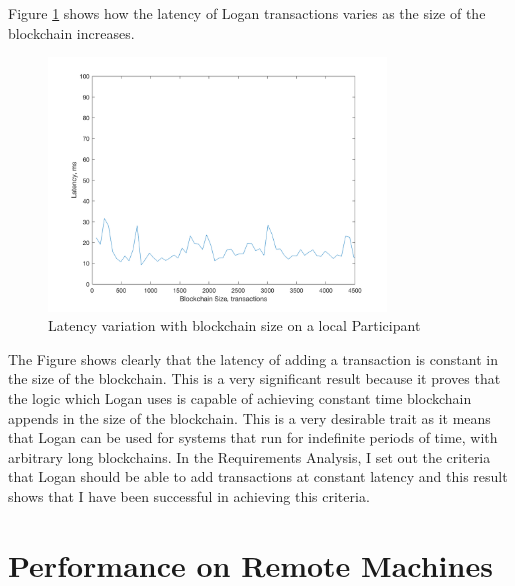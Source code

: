 \documentclass[12pt,a4paper,twoside,openright]{report}
\begin{document}
	Figure \ref{fig:locallatency} shows how the latency of Logan transactions varies as the size of the blockchain increases. 
	\begin{figure}
		\centering
		\includegraphics[width=0.8\textwidth]{figs/local_latency_vs_size.png}
		\caption{Latency variation with blockchain size on a local Participant}
		\label{fig:locallatency}
	\end{figure}
	The Figure shows clearly that the latency of adding a transaction is constant in the size of the blockchain.
	This is a very significant result because it proves that the logic which Logan uses is capable of achieving constant time blockchain appends in the size of the blockchain.
	This is a very desirable trait as it means that Logan can be used for systems that run for indefinite periods of time, with arbitrary long blockchains.
	In the Requirements Analysis, I set out the criteria that Logan should be able to add transactions at constant latency and this result shows that I have been successful in achieving this criteria.\\
	\section{Performance on Remote Machines}
\end{document}
